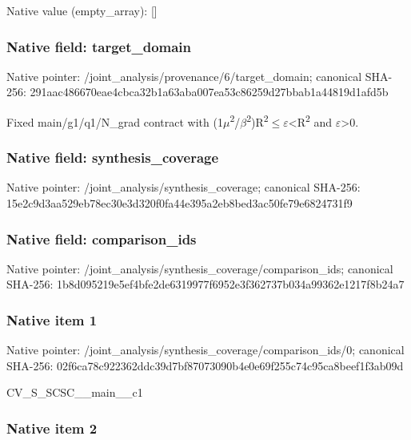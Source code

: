 \documentclass[10pt,a4paper]{article}
\begin{document}
Native value (empty\_array): []



\subsubsection{Native field: target\_domain}


Native pointer: /joint\_analysis/provenan\allowbreak{}ce/6/target\_domain; canonical SHA-256: 291aac486670eae4cbca32b1\allowbreak{}a63aba007ea53c86259d27bb\allowbreak{}ab1a44819d1afd5b


Fixed main/g1/q1/N\_grad contract with (1\ensuremath{\mu}\textsuperscript{2}/\ensuremath{\beta}\textsuperscript{2})R\textsuperscript{2}\ensuremath{\le}\ensuremath{\varepsilon}<R\textsuperscript{2} and \ensuremath{\varepsilon}>0.


\subsubsection{Native field: synthesis\_coverage}


Native pointer: /joint\_analysis/synthesis\_coverage; canonical SHA-256: 15e2c9d3aa529eb78ec30e3d\allowbreak{}320f0fa44e395a2eb8bed3ac\allowbreak{}50fe79e6824731f9



\subsubsection{Native field: comparison\_ids}


Native pointer: /joint\_analysis/synthesi\allowbreak{}s\_coverage/comparison\_id\allowbreak{}s; canonical SHA-256: 1b8d095219e5ef4bfe2de631\allowbreak{}9977f6952e3f362737b034a9\allowbreak{}9362e1217f8b24a7



\subsubsection{Native item 1}


Native pointer: /joint\_analysis/synthesi\allowbreak{}s\_coverage/comparison\_id\allowbreak{}s/0; canonical SHA-256: 02f6ca78c922362ddc39d7bf\allowbreak{}87073090b4e0e69f255c74c9\allowbreak{}5ca8beef1f3ab09d


CV\_S\_SCSC\_\_main\_\_c1


\subsubsection{Native item 2}
\end{document}
